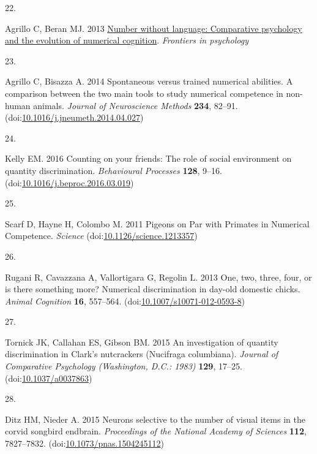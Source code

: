 \documentclass[
  ,pub,floatsintext]{apa6}
\newlength{\cslhangindent}
\newlength{\csllabelwidth}
\newlength{\cslentryspacingunit} %
\newenvironment{CSLReferences}[2] %
 {%
  \setlength{\parindent}{0pt}
  \ifodd #1
  \let\oldpar\par
  \def\par{\hangindent=\cslhangindent\oldpar}
  \fi
  \setlength{\parskip}{#2\cslentryspacingunit}
 }%
 {}
\newcommand{\CSLLeftMargin}[1]{\parbox[t]{\csllabelwidth}{#1}}
\newcommand{\CSLRightInline}[1]{\parbox[t]{\linewidth - \csllabelwidth}{#1}\break}
\begin{document}
\begin{CSLReferences}{0}{0}
\leavevmode{}%
\CSLLeftMargin{22. }%
\CSLRightInline{Agrillo C, Beran MJ. 2013 \href{https://www.academia.edu/6879466/Number_without_language_comparative_psychology_and_the_evolution_of_numerical_cognition}{Number without language: Comparative psychology and the evolution of numerical cognition}. \emph{Frontiers in psychology} }

\leavevmode{}%
\CSLLeftMargin{23. }%
\CSLRightInline{Agrillo C, Bisazza A. 2014 Spontaneous versus trained numerical abilities. {A} comparison between the two main tools to study numerical competence in non-human animals. \emph{Journal of Neuroscience Methods} \textbf{234}, 82--91. (doi:\href{https://doi.org/10.1016/j.jneumeth.2014.04.027}{10.1016/j.jneumeth.2014.04.027})}

\leavevmode{}%
\CSLLeftMargin{24. }%
\CSLRightInline{Kelly EM. 2016 Counting on your friends: {The} role of social environment on quantity discrimination. \emph{Behavioural Processes} \textbf{128}, 9--16. (doi:\href{https://doi.org/10.1016/j.beproc.2016.03.019}{10.1016/j.beproc.2016.03.019})}

\leavevmode{}%
\CSLLeftMargin{25. }%
\CSLRightInline{Scarf D, Hayne H, Colombo M. 2011 Pigeons on {Par} with {Primates} in {Numerical} {Competence}. \emph{Science} (doi:\href{https://doi.org/10.1126/science.1213357}{10.1126/science.1213357})}

\leavevmode{}%
\CSLLeftMargin{26. }%
\CSLRightInline{Rugani R, Cavazzana A, Vallortigara G, Regolin L. 2013 One, two, three, four, or is there something more? {Numerical} discrimination in day-old domestic chicks. \emph{Animal Cognition} \textbf{16}, 557--564. (doi:\href{https://doi.org/10.1007/s10071-012-0593-8}{10.1007/s10071-012-0593-8})}

\leavevmode{}%
\CSLLeftMargin{27. }%
\CSLRightInline{Tornick JK, Callahan ES, Gibson BM. 2015 An investigation of quantity discrimination in {Clark}'s nutcrackers ({Nucifraga} columbiana). \emph{Journal of Comparative Psychology (Washington, D.C.: 1983)} \textbf{129}, 17--25. (doi:\href{https://doi.org/10.1037/a0037863}{10.1037/a0037863})}

\leavevmode{}%
\CSLLeftMargin{28. }%
\CSLRightInline{Ditz HM, Nieder A. 2015 Neurons selective to the number of visual items in the corvid songbird endbrain. \emph{Proceedings of the National Academy of Sciences} \textbf{112}, 7827--7832. (doi:\href{https://doi.org/10.1073/pnas.1504245112}{10.1073/pnas.1504245112})}


\end{CSLReferences}
\end{document}
